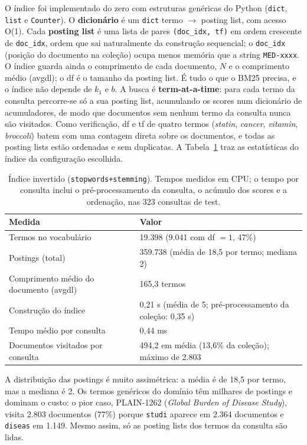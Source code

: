 \documentclass[10pt,a4paper]{article}
\newcommand{\pq}[1]{\mbox{PLAIN-#1}}        %
\begin{document}
O índice foi implementado do zero com estruturas genéricas do Python (\texttt{dict}, \texttt{list} e \texttt{Counter}). O \textbf{dicionário} é um \texttt{dict} termo $\to$ posting list, com acesso O(1). Cada \textbf{posting list} é uma lista de pares \texttt{(doc\_idx, tf)} em ordem crescente de \texttt{doc\_idx}, ordem que sai naturalmente da construção sequencial; o \texttt{doc\_idx} (posição do documento na coleção) ocupa menos memória que a string \texttt{MED-xxxx}. O índice guarda ainda o comprimento de cada documento, $N$ e o comprimento médio (avgdl); o df é o tamanho da posting list. É tudo o que o BM25 precisa, e o índice não depende de $k_1$ e $b$. A busca é \textbf{term-at-a-time}: para cada termo da consulta percorre-se só a sua posting list, acumulando os scores num dicionário de acumuladores, de modo que documentos sem nenhum termo da consulta nunca são visitados. Como verificação, df e tf de quatro termos (\emph{statin}, \emph{cancer}, \emph{vitamin}, \emph{broccoli}) batem com uma contagem direta sobre os documentos, e todas as posting lists estão ordenadas e sem duplicatas. A Tabela~\ref{tab:indice} traz as estatísticas do índice da configuração escolhida.

\begin{table}[!htb]
\centering\small
\caption{Índice invertido (\texttt{stopwords+stemming}). Tempos medidos em CPU; o tempo por consulta inclui o pré-processamento da consulta, o acúmulo dos scores e a ordenação, nas 323 consultas de test.}
\label{tab:indice}
\begin{tabular}{@{}ll@{}}
\toprule
Medida & Valor \\
\midrule
Termos no vocabulário & 19.398 (9.041 com df $=1$, 47\%) \\
Postings (total) & 359.738 (média de 18,5 por termo; mediana 2) \\
Comprimento médio do documento (avgdl) & 165,3 termos \\
Construção do índice & 0,21 s (média de 5; pré-processamento da coleção: 0,35 s) \\
Tempo médio por consulta & 0,44 ms \\
Documentos visitados por consulta & 494,2 em média (13,6\% da coleção); máximo de 2.803 \\
\bottomrule
\end{tabular}
\end{table}

A distribuição das postings é muito assimétrica: a média é de 18,5 por termo, mas a mediana é 2. Os termos genéricos do domínio têm milhares de postings e dominam o custo: o pior caso, \pq{1262} (\emph{Global Burden of Disease Study}), visita 2.803 documentos (77\%) porque \texttt{studi} aparece em 2.364 documentos e \texttt{diseas} em 1.149. Mesmo assim, só as posting lists dos termos da consulta são lidas.
\end{document}
